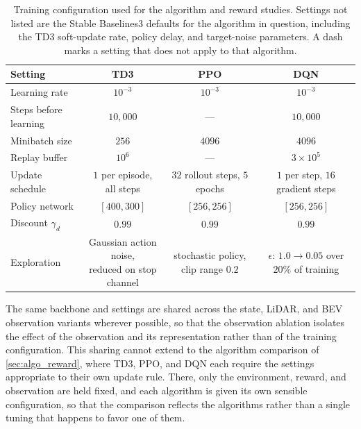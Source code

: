 \begin{table}[H]
\centering
\caption{Training configuration used for the algorithm and reward studies. Settings not listed are the Stable Baselines3 defaults for the algorithm in question, including the TD3 soft-update rate, policy delay, and target-noise parameters. A dash marks a setting that does not apply to that algorithm.}
\label{tab:training_config}
\begin{tabular}{lccc}
\toprule
Setting & TD3 & PPO & DQN \\
\midrule
Learning rate            & $10^{-3}$        & $10^{-3}$       & $10^{-3}$ \\
Steps before learning    & $10{,}000$       & ---             & $10{,}000$ \\
Minibatch size           & $256$            & $4096$          & $4096$ \\
Replay buffer            & $10^{6}$         & ---             & $3\times10^{5}$ \\
Update schedule          & \makecell{$1$ per episode,\\all steps}  & \makecell{$32$ rollout steps,\\$5$ epochs} & \makecell{$1$ per step,\\$16$ gradient steps} \\
Policy network           & $[400, 300]$     & $[256, 256]$    & $[256, 256]$ \\
Discount $\gamma_d$      & $0.99$           & $0.99$          & $0.99$ \\
Exploration              & \makecell{Gaussian action noise,\\reduced on stop channel} & \makecell{stochastic policy,\\clip range $0.2$} & \makecell{$\epsilon$: $1.0 \rightarrow 0.05$\\over $20\%$ of training} \\
\bottomrule
\end{tabular}
\end{table}

The same backbone and settings are shared across the state, LiDAR, and BEV observation variants wherever possible, so that the observation ablation isolates the effect of the observation and its representation rather than of the training configuration. This sharing cannot extend to the algorithm comparison of \cref{sec:algo_reward}, where TD3, PPO, and DQN each require the settings appropriate to their own update rule. There, only the environment, reward, and observation are held fixed, and each algorithm is given its own sensible configuration, so that the comparison reflects the algorithms rather than a single tuning that happens to favor one of them.

